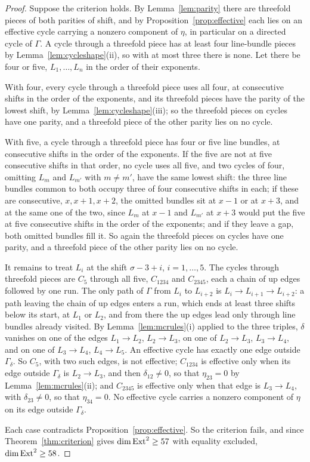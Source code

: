 \begin{proof}
Suppose the criterion holds. By Lemma~\ref{lem:parity} there are threefold pieces of both parities of shift, and by Proposition~\ref{prop:effective} each lies on an effective cycle carrying a nonzero component of $\eta$, in particular on a directed cycle of $\Gamma$. A cycle through a threefold piece has at least four line-bundle pieces by Lemma~\ref{lem:cycleshape}(ii), so with at most three there is none. Let there be four or five, $L_{1},\dots,L_{n}$ in the order of their exponents.

With four, every cycle through a threefold piece uses all four, at consecutive shifts in the order of the exponents, and its threefold pieces have the parity of the lowest shift, by Lemma~\ref{lem:cycleshape}(iii); so the threefold pieces on cycles have one parity, and a threefold piece of the other parity lies on no cycle.

With five, a cycle through a threefold piece has four or five line bundles, at consecutive shifts in the order of the exponents. If the five are not at five consecutive shifts in that order, no cycle uses all five, and two cycles of four, omitting $L_{m}$ and $L_{m'}$ with $m\ne m'$, have the same lowest shift: the three line bundles common to both occupy three of four consecutive shifts in each; if these are consecutive, $x,x+1,x+2$, the omitted bundles sit at $x-1$ or at $x+3$, and at the same one of the two, since $L_{m}$ at $x-1$ and $L_{m'}$ at $x+3$ would put the five at five consecutive shifts in the order of the exponents; and if they leave a gap, both omitted bundles fill it. So again the threefold pieces on cycles have one parity, and a threefold piece of the other parity lies on no cycle.

It remains to treat $L_{i}$ at the shift $\sigma-3+i$, $i=1,\dots,5$. The cycles through threefold pieces are $C_{5}$ through all five, $C_{1234}$ and $C_{2345}$, each a chain of up edges followed by one run. The only path of $\Gamma$ from $L_{i}$ to $L_{i+2}$ is $L_{i}\to L_{i+1}\to L_{i+2}$: a path leaving the chain of up edges enters a run, which ends at least three shifts below its start, at $L_{1}$ or $L_{2}$, and from there the up edges lead only through line bundles already visited. By Lemma~\ref{lem:mcrules}(i) applied to the three triples, $\delta$ vanishes on one of the edges $L_{1}\to L_{2}$, $L_{2}\to L_{3}$, on one of $L_{2}\to L_{3}$, $L_{3}\to L_{4}$, and on one of $L_{3}\to L_{4}$, $L_{4}\to L_{5}$. An effective cycle has exactly one edge outside $\Gamma_{\delta}$. So $C_{5}$, with two such edges, is not effective; $C_{1234}$ is effective only when its edge outside $\Gamma_{\delta}$ is $L_{2}\to L_{3}$, and then $\delta_{12}\ne0$, so that $\eta_{23}=0$ by Lemma~\ref{lem:mcrules}(ii); and $C_{2345}$ is effective only when that edge is $L_{3}\to L_{4}$, with $\delta_{23}\ne0$, so that $\eta_{34}=0$. No effective cycle carries a nonzero component of $\eta$ on its edge outside $\Gamma_{\delta}$.

Each case contradicts Proposition~\ref{prop:effective}. So the criterion fails, and since Theorem~\ref{thm:criterion} gives $\dim\mathrm{Ext}^{2}\ge57$ with equality excluded, $\dim\mathrm{Ext}^{2}\ge58$.
\end{proof}

